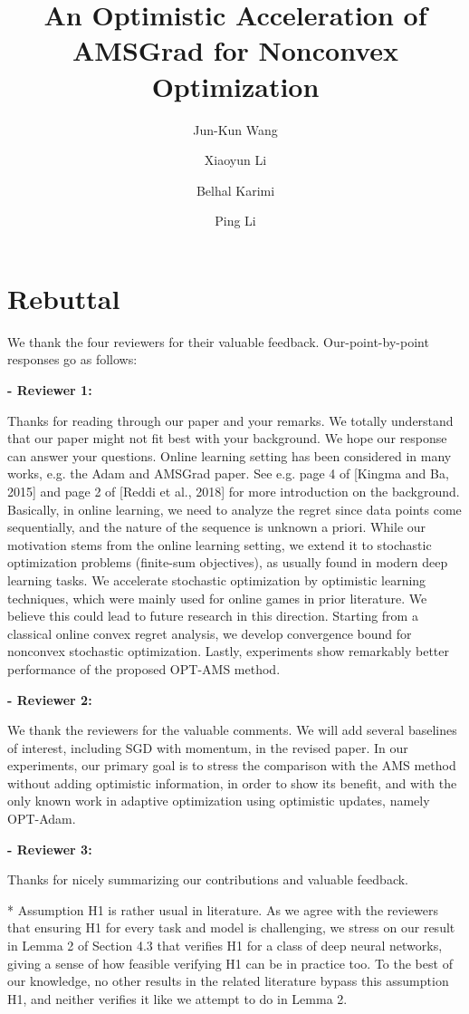 \documentclass{article}
\title{An Optimistic Acceleration of AMSGrad for Nonconvex Optimization}
\author{Jun-Kun Wang \and Xiaoyun Li \and Belhal Karimi \and Ping Li}
\date{}
\begin{document}
\maketitle

\section{Rebuttal}

We thank the four reviewers for their valuable feedback. 
Our-point-by-point responses go as follows:



\textbf{- Reviewer 1:}

Thanks for reading through our paper and your remarks. 
We totally understand that our paper might not fit best with your background. We hope our response can answer your questions.
Online learning setting has been considered in many works, e.g. the Adam and AMSGrad paper. See e.g. page 4 of [Kingma and Ba, 2015] and page 2 of [Reddi et al., 2018] for more introduction on the background. 
Basically, in online learning, we need to analyze the regret since data points come sequentially, and the nature of the sequence is unknown a priori. 
While our motivation stems from the online learning setting, we extend it to stochastic optimization problems (finite-sum objectives), as usually found in modern deep learning tasks. 
We accelerate stochastic optimization by optimistic learning techniques, which were mainly used for online games in prior literature. 
We believe this could lead to future research in this direction. 
Starting from a classical online convex regret analysis, we develop convergence bound for nonconvex stochastic optimization. 
Lastly, experiments show remarkably better performance of the proposed OPT-AMS method.



\textbf{- Reviewer 2:}

We thank the reviewers for the valuable comments.
We will add several baselines of interest, including SGD with momentum, in the revised paper.
In our experiments, our primary goal is to stress the comparison with the AMS method without adding optimistic information, in order to show its benefit, and with the only known work in adaptive optimization using optimistic updates, namely OPT-Adam.


\textbf{- Reviewer 3:}

Thanks for nicely summarizing our contributions and valuable feedback.

* Assumption H1 is rather usual in literature.
As we agree with the reviewers that ensuring H1 for every task and model is challenging, we stress on our result in Lemma 2 of Section 4.3 that verifies H1 for a class of deep neural networks, giving a sense of how feasible verifying H1 can be in practice too.
To the best of our knowledge, no other results in the related literature bypass this assumption H1, and neither verifies it like we attempt to do in Lemma 2.
\end{document}
